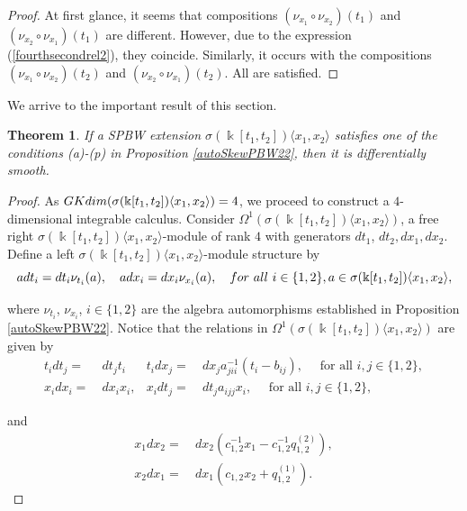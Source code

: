\documentclass{amsart}
\newtheorem{theorem}{Theorem}[section]
\theoremstyle{definition}
\theoremstyle{remark}
\numberwithin{equation}{section}
\begin{document}
\begin{proof}
At first glance, it seems that compositions $(\nu_{x_1} \circ \nu_{x_2})(t_1)$ and $(\nu_{x_2} \circ \nu_{x_1})(t_1)$ are different. However, due to the expression {\rm (}\ref{fourthsecondrel2}{\rm )}, they coincide. Similarly, it occurs with the compositions $(\nu_{x_1} \circ \nu_{x_2})(t_2)$ and $(\nu_{x_2} \circ \nu_{x_1})(t_2)$. All are satisfied.
\end{proof}

We arrive to the important result of this section.

\begin{theorem}\label{smoothPBW22}
If a SPBW extension $\sigma(\Bbbk[t_1, t_2])\langle x_1, x_2\rangle$ satisfies one of the conditions {\rm (a)-(p)} in Proposition \ref{autoSkewPBW22}, then it is differentially smooth.
\end{theorem}
\begin{proof}
As ${\rm GKdim}(\sigma(\Bbbk[t_1, t_2])\langle x_1, x_2\rangle) = 4$, we proceed to construct a $4$-dimensional integrable calculus. Consider $\Omega^{1}(\sigma(\Bbbk[t_1, t_2])\langle x_1, x_2\rangle)$, a free right $\sigma(\Bbbk[t_1, t_2])\langle x_1, x_2\rangle$-module of rank $4$ with generators $dt_1$, $dt_2, dx_1, dx_2$. Define a left $\sigma(\Bbbk[t_1, t_2])\langle x_1, x_2\rangle$-module structure by
    \begin{equation}\label{relrightmod322}
        adt_i = dt_i \nu_{t_i}(a), \quad adx_i = dx_i\nu_{x_i}(a),  \quad {\rm for\ all}\ i\in\{1, 2\}, a\in \sigma(\Bbbk[t_1, t_2])\langle x_1, x_2\rangle,
    \end{equation}
    
where $\nu_{t_i}$, $\nu_{x_i}$, $i\in\{1, 2\}$ are the algebra automorphisms established in Proposition \ref{autoSkewPBW22}. Notice that the relations in $\Omega^{1}(\sigma(\Bbbk[t_1, t_2])\langle x_1, x_2\rangle)$ are given by
    \begin{align}
        t_idt_j = &\ dt_j t_i & t_idx_j = &\ dx_ja_{jii}^{-1}(t_i-b_{ij}), \quad \text{ for all } i,j \in \{1, 2\}, \label{reltx4}  \\
        x_idx_i = &\ dx_ix_i,  &  x_idt_j = &\ dt_ja_{ijj}x_i, \quad \text{ for all } i,j \in \{1, 2\}, \label{reltx4.} 
         \end{align}

and 
        \begin{align}
        x_1dx_2 = &\ dx_2(c_{1,2}^{-1}x_1-c_{1,2}^{-1}q_{1,2}^{(2)}),  \\   x_2dx_1 = &\ dx_1(c_{1,2}x_2+q_{1,2}^{(1)}). \label{relxx4} 
    \end{align}


\end{proof}
\end{document}
